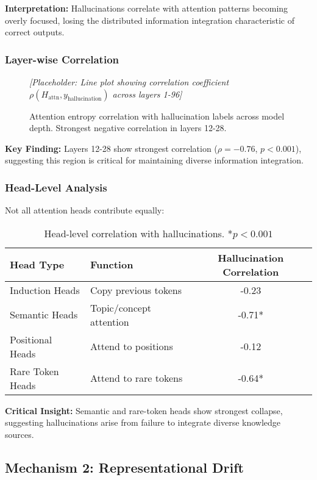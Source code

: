 \documentclass[11pt]{article}
\begin{document}
\textbf{Interpretation:} Hallucinations correlate with attention patterns becoming overly focused, losing the distributed information integration characteristic of correct outputs.

\subsubsection{Layer-wise Correlation}

\begin{figure}[H]
\centering
\textit{[Placeholder: Line plot showing correlation coefficient $\rho(H_{\text{attn}}, y_{\text{hallucination}})$ across layers 1-96]}
\caption{Attention entropy correlation with hallucination labels across model depth. Strongest negative correlation in layers 12-28.}
\end{figure}

\textbf{Key Finding:} Layers 12-28 show strongest correlation ($\rho = -0.76$, $p < 0.001$), suggesting this region is critical for maintaining diverse information integration.

\subsubsection{Head-Level Analysis}

Not all attention heads contribute equally:

\begin{table}[H]
\centering
\begin{tabular}{@{}llc@{}}
\toprule
\textbf{Head Type} & \textbf{Function} & \textbf{Hallucination Correlation} \\ \midrule
Induction Heads & Copy previous tokens & -0.23 \\
Semantic Heads & Topic/concept attention & -0.71* \\
Positional Heads & Attend to positions & -0.12 \\
Rare Token Heads & Attend to rare tokens & -0.64* \\ \bottomrule
\end{tabular}
\caption{Head-level correlation with hallucinations. *$p < 0.001$}
\end{table}

\textbf{Critical Insight:} Semantic and rare-token heads show strongest collapse, suggesting hallucinations arise from failure to integrate diverse knowledge sources.

\subsection{Mechanism 2: Representational Drift}
\end{document}
